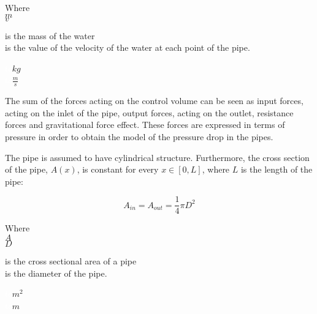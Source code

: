 \begin{minipage}[t]{0.20\textwidth}
Where\\
\hspace*{8mm} $m$ \\
\hspace*{8mm} $v$ 
\end{minipage}
\begin{minipage}[t]{0.68\textwidth}
\vspace*{2mm}
is the mass of the water\\
is the value of the velocity of the water at each point of the pipe.

\end{minipage}
\begin{minipage}[t]{0.10\textwidth}
\vspace*{2mm}
\textcolor{White}{te}$\unit{kg}$\\
\textcolor{White}{te}$\unit{\frac{m}{s}}$
\end{minipage}

The sum of the forces acting on the control volume can be seen as input forces, acting on the inlet of the pipe, output forces, acting on the outlet, resistance forces and gravitational force effect.  
These forces are expressed in terms of pressure in order to obtain the model of the pressure drop in the pipes. 

The pipe is assumed to have cylindrical structure. Furthermore, the cross section of the pipe, $A(x)$, is constant for every $x \in [0,L]$, where $L$ is the length of the pipe:

\begin{equation}
  A_{in} = A_{out} = \frac{1}{4}\pi D^{2}
\end{equation}

 \begin{minipage}[t]{0.20\textwidth}
Where\\
\hspace*{8mm} $A$ \\
\hspace*{8mm} $D$
\end{minipage}
\begin{minipage}[t]{0.68\textwidth}
\vspace*{2mm}
is the cross sectional area of a pipe\\
is the diameter of the pipe.
\end{minipage}
\begin{minipage}[t]{0.10\textwidth}
\vspace*{2mm}
\textcolor{White}{te}$\unit{m^{2}}$\\
\textcolor{White}{te}$\unit{m}$
\end{minipage}

